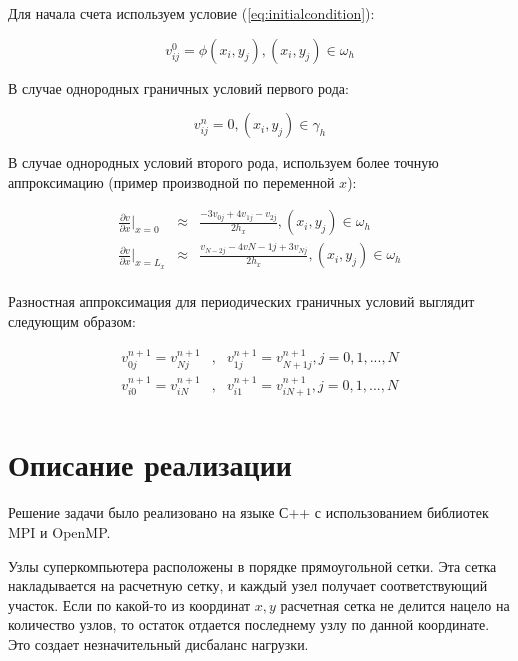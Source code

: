 \documentclass[12pt,a4paper]{scrartcl}
\begin{document}
Для начала счета используем условие (\ref{eq:initialcondition}):

\begin{equation}
    \label{eq:begincalc}
        v_{ij}^0 = \phi(x_i,y_j), (x_i,y_j) \in \omega_h
\end{equation}

В случае однородных граничных условий первого рода:

\begin{equation}
    \label{eq:secondtype}
        v_{ij}^n = 0, (x_i,y_j) \in \gamma_h
\end{equation}

В случае однородных условий второго рода, используем более точную аппроксимацию (пример производной по переменной $x$):


\begin{equation}
    \label{eq:consistentsecond}
    \begin{array}{lcl}
        \frac{\partial v}{\partial x}|_{x = 0} & \approx & \frac{-3v_{0j} + 4v_{1j} - v_{2j}}{2h_x}, (x_i, y_j) \in \omega_h \\
        \frac{\partial v}{\partial x}|_{x = L_x} & \approx & \frac{v_{N-2j} - 4v{N-1j} + 3v_{Nj}}{2h_x}, (x_i, y_j) \in \omega_h \\
    \end{array}
\end{equation}

Разностная аппроксимация для периодических граничных условий выглядит следующим образом:

\begin{equation}
    \label{eq:periodicapprox}
    \begin{array}{lcl}
        v_{0j}^{n+1} = v_{Nj}^{n+1} & , & v_{1j}^{n+1} = v_{N+1j}^{n+1},j=0,1,...,N \\
        v_{i0}^{n+1} = v_{iN}^{n+1} & , & v_{i1}^{n+1} = v_{iN+1}^{n+1},j=0,1,...,N \\
    \end{array}
\end{equation}

\section{Описание реализации}

Решение задачи было реализовано на языке С++ с использованием библиотек MPI и OpenMP.

Узлы суперкомпьютера расположены в порядке прямоугольной сетки. Эта сетка накладывается на расчетную сетку,
и каждый узел получает соответствующий участок. Если по какой-то из координат $x,y$ расчетная сетка не делится нацело
на количество узлов, то остаток отдается последнему узлу по данной координате. Это создает незначительный дисбаланс нагрузки.
\end{document}
